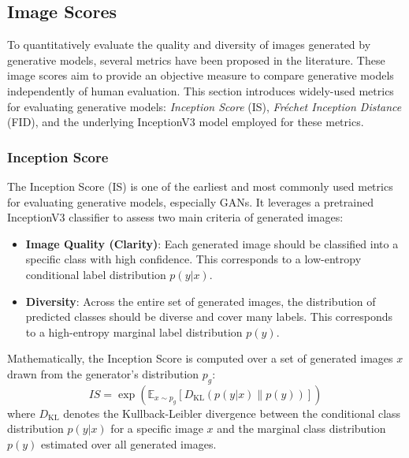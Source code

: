 


\subsection{Image Scores}\label{theoretical_image_scores}

To quantitatively evaluate the quality and diversity of images generated by generative models, several metrics have been proposed in the literature. These image scores aim to provide an objective measure to compare generative models independently of human evaluation. This section introduces widely-used metrics for evaluating generative models: \textit{Inception Score} (IS), \textit{Fréchet Inception Distance} (FID), and the underlying InceptionV3 model employed for these metrics.

\subsubsection[Inception Score - IS]{Inception Score}
The Inception Score (IS) \cite{salimans2016improvedtechniquestraininggans} is one of the earliest and most commonly used metrics for evaluating generative models, especially GANs. It leverages a pretrained InceptionV3 classifier to assess two main criteria of generated images:

\begin{itemize}
    \item \textbf{Image Quality (Clarity)}: Each generated image should be classified into a specific class with high confidence. This corresponds to a low-entropy conditional label distribution \( p(y|x) \).
    \item \textbf{Diversity}: Across the entire set of generated images, the distribution of predicted classes should be diverse and cover many labels. This corresponds to a high-entropy marginal label distribution \( p(y) \).
\end{itemize}

\noindent
Mathematically, the Inception Score is computed over a set of generated images \(x\) drawn from the generator's distribution \(p_g\):
\begin{equation}
IS = \exp \left( \mathbb{E}_{x \sim p_g} \left[ D_{\text{KL}}(p(y|x) \| p(y)) \right] \right)
\end{equation}
where \( D_{\text{KL}} \) denotes the Kullback-Leibler divergence between the conditional class distribution \(p(y|x)\) for a specific image \(x\) and the marginal class distribution \(p(y)\) estimated over all generated images. 

